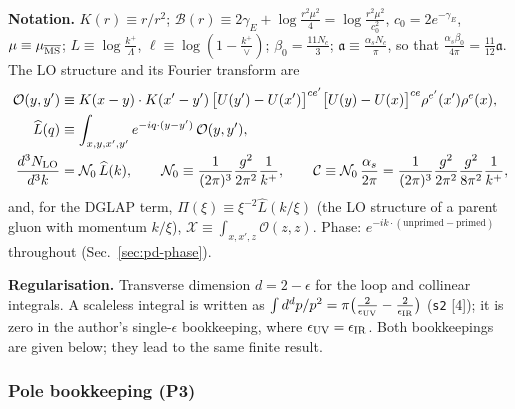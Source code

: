 \documentclass[10pt]{article}
\begin{document}
\medskip
\noindent\textbf{Notation.} $K(r)\equiv r/r^{2}$; $\mathcal{B}(r)\equiv2\gamma_{E}+\log\frac{r^{2}\mu^{2}}{4}=\log\frac{r^{2}\mu^{2}}{c_{0}^{2}}$, $c_{0}=2e^{-\gamma_{E}}$, $\mu\equiv\mu_{\overline{\rm MS}}$; $L\equiv\log\frac{k^{+}}{\Lambda}$, $\ell\equiv\log(1-\frac{k^{+}}{\vee})$; $\beta_{0}=\frac{11N_{c}}{3}$; $\mathfrak{a}\equiv\frac{\alpha_{s}N_{c}}{\pi}$, so that $\frac{\alpha_{s}\beta_{0}}{4\pi}=\frac{11}{12}\mathfrak{a}$. The LO structure and its Fourier transform are
\begin{align}
\mathcal{O}(y,y')&\equiv K(x-y)\cdot K(x'-y')\,\big[U(y')-U(x')\big]^{ce'}\big[U(y)-U(x)\big]^{ce}\rho^{e'}(x')\rho^{e}(x),\notag\\
\widehat{L}(q)&\equiv\int_{x,y,x',y'}e^{-iq\cdot(y-y')}\,\mathcal{O}(y,y'),\notag\\
\frac{d^{3}N_{\rm LO}}{d^{3}k}&=\mathcal{N}_{0}\,\widehat{L}(k),\qquad \mathcal{N}_{0}\equiv\frac{1}{(2\pi)^{3}}\frac{g^{2}}{2\pi^{2}}\frac{1}{k^{+}},\qquad
\mathcal{C}\equiv\mathcal{N}_{0}\,\frac{\alpha_{s}}{2\pi}=\frac{1}{(2\pi)^{3}}\frac{g^{2}}{2\pi^{2}}\frac{g^{2}}{8\pi^{2}}\frac{1}{k^{+}},
\label{eq:pd-not}
\end{align}
and, for the DGLAP term, $\Pi(\xi)\equiv\xi^{-2}\widehat{L}(k/\xi)$ (the LO structure of a parent gluon with momentum $k/\xi$), $\mathcal{X}\equiv\int_{x,x',z}\mathcal{O}(z,z)$. Phase: $e^{-ik\cdot(\text{unprimed}-\text{primed})}$ throughout (Sec.~\ref{sec:pd-phase}).

\medskip
\noindent\textbf{Regularisation.} Transverse dimension $d=2-\epsilon$ for the loop and collinear integrals. A scaleless integral is written as $\int d^{d}p/p^{2}=\pi\big(\frac{2}{\epsilon_{\rm UV}}-\frac{2}{\epsilon_{\rm IR}}\big)$ (\texttt{s2} [4]); it is zero in the author's single-$\epsilon$ bookkeeping, where $\epsilon_{\rm UV}=\epsilon_{\rm IR}$. Both bookkeepings are given below; they lead to the same finite result.

\subsubsection{Pole bookkeeping (P3)}
\end{document}
